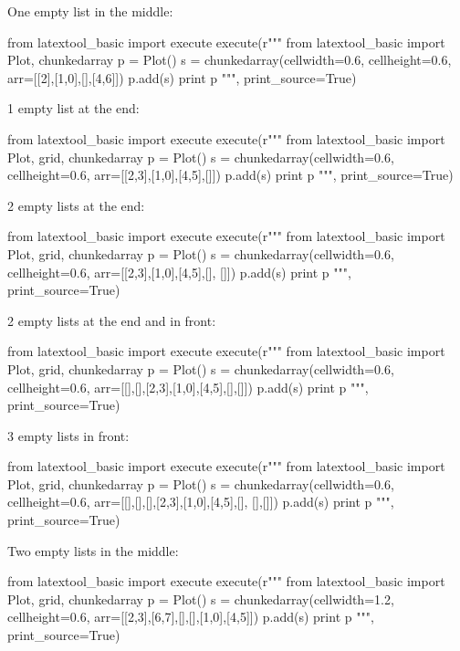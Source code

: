One empty list in the middle:
\begin{python}
from latextool_basic import execute
execute(r"""
from latextool_basic import Plot, chunkedarray
p = Plot()
s = chunkedarray(cellwidth=0.6,
                 cellheight=0.6,
                 arr=[[2],[1,0],[],[4,6]])
p.add(s)
print p
""", print_source=True)
\end{python}



1 empty list at the end:
\begin{python}
from latextool_basic import execute
execute(r"""
from latextool_basic import Plot, grid, chunkedarray
p = Plot()
s = chunkedarray(cellwidth=0.6,
                 cellheight=0.6,
                 arr=[[2,3],[1,0],[4,5],[]])
p.add(s)
print p
""", print_source=True)
\end{python}



2 empty lists at the end:
\begin{python}
from latextool_basic import execute
execute(r"""
from latextool_basic import Plot, grid, chunkedarray
p = Plot()
s = chunkedarray(cellwidth=0.6,
                 cellheight=0.6,
                 arr=[[2,3],[1,0],[4,5],[], []])
p.add(s)
print p
""", print_source=True)
\end{python}



2 empty lists at the end and in front:
\begin{python}
from latextool_basic import execute
execute(r"""
from latextool_basic import Plot, grid, chunkedarray
p = Plot()
s = chunkedarray(cellwidth=0.6,
                 cellheight=0.6,
                 arr=[[],[],[2,3],[1,0],[4,5],[],[]])
p.add(s)
print p
""", print_source=True)
\end{python}



3 empty lists in front:
\begin{python}
from latextool_basic import execute
execute(r"""
from latextool_basic import Plot, grid, chunkedarray
p = Plot()
s = chunkedarray(cellwidth=0.6,
                 cellheight=0.6,
                 arr=[[],[],[],[2,3],[1,0],[4,5],[], [],[]])
p.add(s)
print p
""", print_source=True)
\end{python}










Two empty lists in the middle:
\begin{python}
from latextool_basic import execute
execute(r"""
from latextool_basic import Plot, grid, chunkedarray
p = Plot()
s = chunkedarray(cellwidth=1.2,
                 cellheight=0.6,
                 arr=[[2,3],[6,7],[],[],[1,0],[4,5]])
p.add(s)
print p
""", print_source=True)
\end{python}



